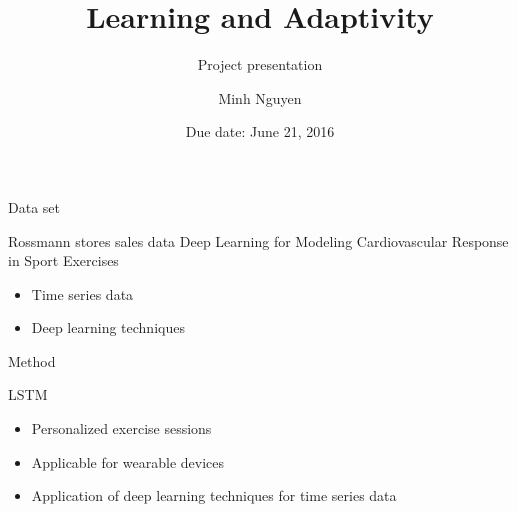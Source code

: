 \documentclass[14pt]{beamer}
\title{Learning and Adaptivity}
\subtitle{Project presentation}
\date{Due date: June 21, 2016}
\author{Minh Nguyen}
\begin{document}
\maketitle

\begin{frame}{Data set}
    \begin{alertblock}{Rossmann stores sales data}
        Deep Learning for Modeling Cardiovascular Response in Sport Exercises
        \begin{itemize}
            \item Time series data
            \item Deep learning techniques
        \end{itemize}
    \end{alertblock}
\end{frame}

\begin{frame}{Method}
    \begin{alertblock}{LSTM}
        
        \begin{itemize}
            \item Personalized exercise sessions
            \item Applicable for wearable devices
            \item Application of deep learning techniques for time series data
        \end{itemize}
        
    \end{alertblock}
\end{frame}

\end{document}
